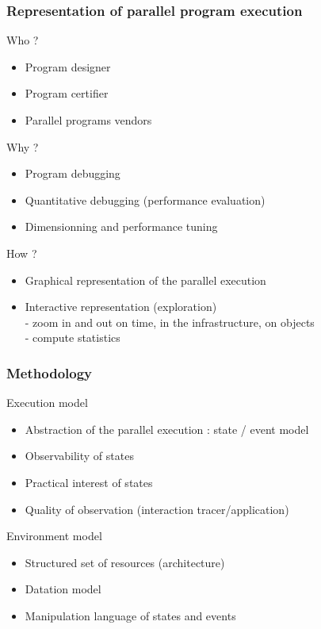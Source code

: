 \begin{frame}
\frametitle{Representation of parallel program execution}
\begin{block}{Who ?}
\begin{itemize}
\item Program designer
\item Program certifier
\item Parallel programs vendors
\end{itemize}
\end{block}
\begin{block}{Why ?}
\begin{itemize}
\item Program debugging
\item Quantitative debugging (performance evaluation)
\item Dimensionning and performance tuning
\end{itemize}
\end{block}
\begin{block}{How ? }
\begin{itemize}
\item Graphical representation of the parallel execution
\item Interactive representation (exploration)\\
- zoom in and out on time, in the infrastructure, on objects\\
- compute statistics
\end{itemize}
\end{block}
\end{frame}
\begin{frame}
\frametitle{Methodology}
\begin{block}{Execution model}
\begin{itemize}
\item Abstraction of the parallel execution : state / event model
\item Observability of states
\item Practical interest of states
\item Quality of observation (interaction tracer/application)
\end{itemize}
\end{block}
\begin{block}{Environment model}
\begin{itemize}
\item Structured set of resources (architecture)
\item Datation model
\item Manipulation language of states and events
\end{itemize}
\end{block}
\end{frame}
